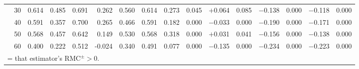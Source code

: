 \documentclass[conference]{IEEEtran}
\theoremstyle{remark}
\newcommand{\RMC}{\mathrm{RMC}}
\begin{document}
\begin{table}[t]
{\begin{tabular}{p{2.2cm}r rrrr rr rr rr rr rr}
  & 30 & 0.614 & 0.485 & 0.691 & 0.262 & 0.560 & 0.614 & 0.273 & 0.045 & \cellcolor{green!15}$+$0.064 & \cellcolor{green!15}0.085 & $-$0.138 & 0.000 & $-$0.118 & 0.000 \\
  & 40 & 0.591 & 0.357 & 0.700 & 0.265 & 0.466 & 0.591 & 0.182 & 0.000 & $-$0.033 & 0.000 & $-$0.190 & 0.000 & $-$0.171 & 0.000 \\
  & 50 & 0.568 & 0.457 & 0.642 & 0.149 & 0.530 & 0.568 & 0.318 & 0.000 & \cellcolor{green!15}$+$0.031 & \cellcolor{green!15}0.041 & $-$0.156 & 0.000 & $-$0.138 & 0.000 \\
  & 60 & 0.400 & 0.222 & 0.512 & -0.024 & 0.340 & 0.491 & 0.077 & 0.000 & $-$0.135 & 0.000 & $-$0.234 & 0.000 & $-$0.223 & 0.000 \\
\bottomrule
\multicolumn{16}{l}{\colorbox{green!15}{\phantom{X}} = that estimator's $\RMC^{\pm}>0$.}
\end{tabular}%
}
\end{table}
\end{document}
